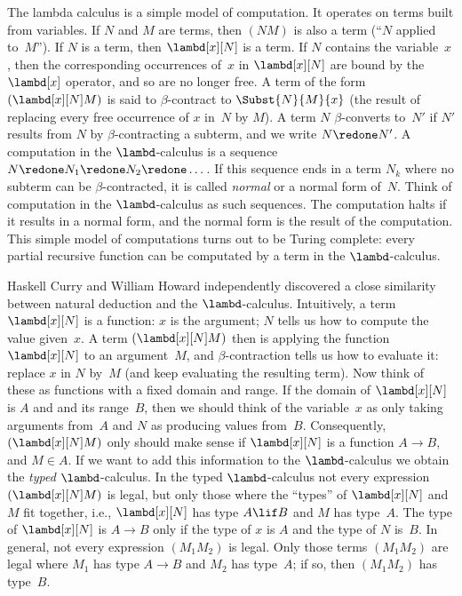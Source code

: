 \documentclass[../../../include/open-logic-section]{subfiles}
\begin{document}


The lambda calculus is a simple model of computation. It operates on
terms built from variables. If $N$ and $M$ are terms, then $(NM)$ is
also a term (``$N$ applied to~$M$''). If $N$ is a term, then
$\lambd[x][N]$ is a term. If $N$ contains the variable~$x$, then the
corresponding occurrences of~$x$ in $\lambd[x][N]$ are bound by the
$\lambd[x]$ operator, and so are no longer free. A term of the form
$(\lambd[x][N]M)$ is said to $\beta$-contract to $\Subst{N}{M}{x}$
(the result of replacing every free occurrence of $x$ in~$N$ by $M$).
A term $N$ $\beta$-converts to~$N'$ if $N'$ results from $N$ by
$\beta$-contracting a subterm, and we write $N \redone N'$. A
computation in the $\lambd$-calculus is a sequence $N \redone N_1
\redone N_2 \redone \dots$. If this sequence ends in a term $N_k$
where no subterm can be $\beta$-contracted, it is called \emph{normal}
or a normal form of~$N$. Think of computation in the $\lambd$-calculus
as such sequences. The computation halts if it results in a normal
form, and the normal form is the result of the computation. This
simple model of computations turns out to be Turing complete: every
partial recursive function can be computated by a term in the $\lambd$-calculus.

Haskell Curry and William Howard independently discovered a close
similarity between natural deduction and the $\lambd$-calculus.
Intuitively, a term $\lambd[x][N]$ is a function: $x$ is the argument;
$N$ tells us how to compute the value given~$x$. A term
$(\lambd[x][N]M)$ then is applying the function $\lambd[x][N]$ to an
argument~$M$, and $\beta$-contraction tells us how to evaluate it:
replace $x$ in $N$ by~$M$ (and keep evaluating the resulting term).
Now think of these as functions with a fixed domain and range. If the
domain of $\lambd[x][N]$ is $A$ and and its range~$B$, then we should
think of the variable~$x$ as only taking arguments from~$A$ and $N$ as
producing values from~$B$. Consequently, $(\lambd[x][N]M)$ only should
make sense if $\lambd[x][N]$ is a function $A \to B$, and $M \in A$.
If we want to add this information to the $\lambd$-calculus we obtain
the \emph{typed} $\lambd$-calculus. In the typed $\lambd$-calculus not
every expression $(\lambd[x][N]M)$ is legal, but only those where the
``types'' of $\lambd[x][N]$ and $M$ fit together, i.e., $\lambd[x][N]$
has type $A \lif B$ and $M$ has type~$A$. The type of $\lambd[x][N]$
is $A \to B$ only if the type of $x$ is $A$ and the type of $N$
is~$B$. In general, not every expression $(M_1M_2)$ is legal. Only
those terms $(M_1M_2)$ are legal where $M_1$ has type $A \to B$ and
$M_2$ has type~$A$; if so, then $(M_1M_2)$ has type~$B$. 
\end{document}
